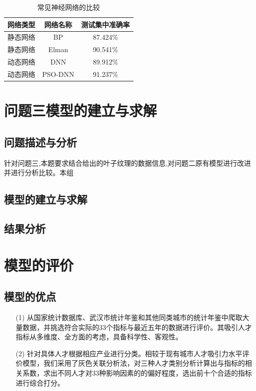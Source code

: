 \documentclass{whutmod}
\begin{document}
		\begin{table}[H]
	 \centering
		\begin{tabular}{ccc}
			\toprule[2pt]
			\multicolumn{1}{m{3cm}}{\centering 网络类型}
			 & \multicolumn{1}{m{3cm}}{\centering 网络名称}
			  &\multicolumn{1}{m{4cm}}{\centering 测试集中准确率}
			  \\
			\midrule[1pt]
			静态网络	 &  BP &87.424\%  \\ 
			静态网络	 &  Elman &90.541\%  \\ 
			动态网络	 &  DNN &89.912\%  \\ 
			动态网络	 &  PSO-DNN &91.237\%  \\ 
			\bottomrule[2pt]	
		\end{tabular}
	\caption{常见神经网络的比较}\label{heng}
	\end{table}



	\section{问题三模型的建立与求解}
    \subsection{问题描述与分析}
    针对问题三,本题要求结合给出的叶子纹理的数据信息,对问题二原有模型进行改进并进行分析比较。本组
    
	
		
    \subsection{模型的建立与求解}
    
    \subsection{结果分析}
	
	
	\section{模型的评价}
	\subsection{模型的优点}
	\begin{itemize}
		\item [(1)] 从国家统计数据库、武汉市统计年鉴和其他同类城市的统计年鉴中爬取大量数据，并挑选符合实际的33个指标与最近五年的数据进行评价。其吸引人才指标从多维度、全方面的考虑，具备科学性、客观性。
		\item [(2)]针对具体人才根据相应产业进行分类。相较于现有城市人才吸引力水平评价模型，我们采用了灰色关联分析法，对三种人才类别分析计算出与指标的相关系数，求出不同人才对33种影响因素的的偏好程度，选出前十个合适的指标进行综合打分。
	\end{itemize}
\end{document}
